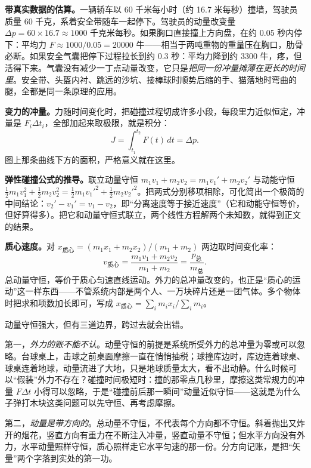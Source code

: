 \textbf{带真实数据的估算。}一辆轿车以 60 千米每小时（约 16.7 米每秒）撞墙，驾驶员质量 60 千克，系着安全带随车一起停下。驾驶员的动量改变量 \(\Delta p=60\times16.7\approx1000\) 千克米每秒。如果胸口直接撞上方向盘，在约 0.05 秒内停下：平均力 \(F\approx1000/0.05=20000\) 牛——相当于两吨重物的重量压在胸口，肋骨必断。如果安全气囊把停下过程拉长到约 0.3 秒：平均力降到约 3300 牛，疼，但活得下来。气囊没有减少一丁点动量改变，它只是\emph{把同一份冲量摊薄在更长的时间里}。安全带、头盔内衬、跳远的沙坑、接棒球时顺势后缩的手、猫落地时弯曲的腿，全都是同一条原理的应用。

\begin{mathbridge}
\textbf{变力的冲量。}力随时间变化时，把碰撞过程切成许多小段，每段里力近似恒定，冲量是 \(F_i\Delta t_i\)，全部加起来取极限，就是积分：
\[
J=\int_{t_1}^{t_2} F(t)\,dt=\Delta p .
\]
图上那条曲线下方的面积，严格意义就在这里。

\textbf{弹性碰撞公式的推导。}联立动量守恒 \(m_1v_1+m_2v_2=m_1v_1'+m_2v_2'\) 与动能守恒 \(\tfrac12 m_1v_1^2+\tfrac12 m_2v_2^2=\tfrac12 m_1v_1'^2+\tfrac12 m_2v_2'^2\)。把两式分别移项相除，可化简出一个极简的中间结论：\(v_2'-v_1'=v_1-v_2\)，即“分离速度等于接近速度”（它和动能守恒等价，但好算得多）。把它和动量守恒式联立，两个线性方程解两个未知数，就得到正文的结果。

\textbf{质心速度。}对 \(x_{\text{质心}}=(m_1x_1+m_2x_2)/(m_1+m_2)\) 两边取时间变化率：
\[
v_{\text{质心}}=\frac{m_1v_1+m_2v_2}{m_1+m_2}=\frac{p_{\text{总}}}{m_{\text{总}}}.
\]
总动量守恒，等价于质心匀速直线运动。外力的总冲量改变的，也正是“质心的运动”这一样东西——不管系统内部是两个人、一万块碎片还是一团气体。多个物体时把求和项数加长即可，写成 \(x_{\text{质心}}=\sum_i m_ix_i/\sum_i m_i\)。
\end{mathbridge}


动量守恒强大，但有三道边界，跨过去就会出错。

第一，\emph{外力的账不能不认}。动量守恒的前提是系统所受外力的总冲量为零或可以忽略。台球桌上，击球之前桌面摩擦一直在悄悄抽税；球撞库边时，库边连着球桌、球桌连着地球，动量流进了大地，只是地球质量太大，看不出动静。什么时候可以“假装”外力不存在？碰撞时间极短时：撞的那零点几秒里，摩擦这类常规力的冲量 \(F\Delta t\) 小得可以忽略，于是“碰撞前后那一瞬间”动量近似守恒——这就是为什么子弹打木块这类问题可以先守恒、再考虑摩擦。

第二，\emph{动量是带方向的}。总动量不守恒，不代表每个方向都不守恒。斜着抛出又炸开的烟花，竖直方向有重力在不断注入冲量，竖直动量不守恒；但水平方向没有外力，水平动量照样守恒，质心照样走它水平匀速的那一份。分方向记账，是把“矢量”两个字落到实处的第一功。

